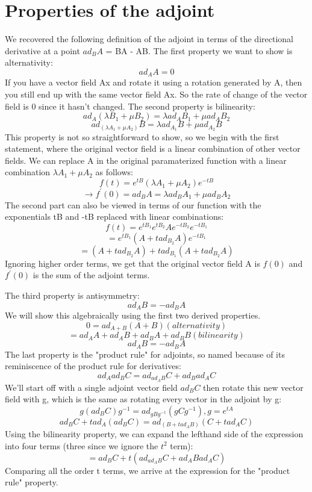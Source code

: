 \documentclass{article}
\begin{document}
\section{Properties of the adjoint}
We recovered the following definition of the adjoint in terms of the directional derivative at a point $ad_{B}A$ = BA - AB. The first property we want to show is alternativity: \[ad_{A}A = 0\]
If you have a vector field Ax and rotate it using a rotation generated by A, then you still end up with the same vector field Ax. So the rate of change of the vector field is 0 since it hasn't changed.
The second property is bilinearity: \[
ad_{A}(\lambda B_{1} + \mu B_{2}) = \lambda ad_{A}B_{1} + \mu ad_{A}B_{2}
\] \[ad_{(\lambda A_{1} + \mu A_{2})}B = \lambda ad_{A_{1}}B + \mu ad_{A_{2}}B\]
This property is not so straightforward to show, so we begin with the first statement, where the original vector field is a linear combination of other vector fields. We can replace A in the original paramaterized function with a linear combination $\lambda A_{1} + \mu A_{2}$ as follows:
\[
f(t) =  e^{tB}(\lambda A_{1} + \mu A_{2})e^{-tB} 
\] \[
\longrightarrow f^{'}(0) = ad_{B}A = \lambda ad_{B}A_{1} + \mu ad_{B}A_{2}
\]
The second part can also be viewed in terms of our function with the exponentials tB and -tB replaced with linear combinations:
\[
f(t) =  e^{tB_{1}}e^{tB_{2}}Ae^{-tB_{2}}e^{-tB_{1}}
\]
\[
= e^{tB_{1}}(A + tad_{B_{2}}A)e^{-tB_{1}}
\]
\[
= (A + tad_{B_{2}}A) + tad_{B_{1}}(A + tad_{B_{2}}A)
\]
Ignoring higher order terms, we get that the original vector field A is $f(0)$ and $f^{'}(0)$ is the sum of the adjoint terms.

The third property is antisymmetry:
\[ad_{A}B = -ad_{B}A\]
We will show this algebraically using the first two derived properties.
\[
0 = ad_{A+B}(A+B) (alternativity)
\]
\[
= ad_{A}A + ad_{A}B + ad_{B}A + ad_{B}B (bilinearity)
\]
\[
ad_{A}B = -ad_{B}A
\]
The last property is the "product rule" for adjoints, so named because of its reminiscence of the product rule for derivatives:
\[
ad_{A}ad_{B}C = ad_{ad_{A}B}C + ad_{B}ad_{A}C
\]
We'll start off with a single adjoint vector field $ad_{B}C$ then rotate this new vector field with g, which is the same as rotating every vector in the adjoint by g:
\[
g(ad_{B}C)g^{-1} = ad_{gBg^{-1}}(gCg^{-1}), g = e^{tA}
\]
\[
ad_{B}C + tad_{A}(ad_{B}C) = ad_{(B+tad_{A}B)}(C + tad_{A}C)
\]
Using the bilinearity property, we can expand the lefthand side of the expression into four terms (three since we ignore the $t^2$ term):
\[
= ad_{B}C + t(ad_{ad_{A}B}C + ad_{A}Bad_{A}C)
\]
Comparing all the order t terms, we arrive at the expression for the "product rule" property.
\end{document}
